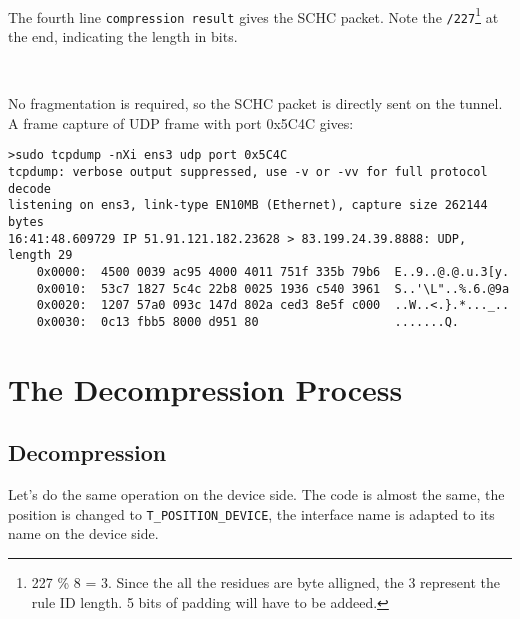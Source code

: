 ~~~

The fourth line \texttt{compression result} gives the SCHC packet. Note the \texttt{/227}\footnote {227 \% 8 = 3.  Since the all the residues are byte alligned, the 3 represent the rule ID length. 5 bits of padding will have to be addeed.} at the end, indicating the length in bits. 



~~

No fragmentation is required, so the SCHC packet is directly sent on the tunnel. A frame capture of UDP frame with port 0x5C4C gives:

\begin{lstlisting}[basicstyle=\ttfamily\scriptsize]
>sudo tcpdump -nXi ens3 udp port 0x5C4C
tcpdump: verbose output suppressed, use -v or -vv for full protocol decode
listening on ens3, link-type EN10MB (Ethernet), capture size 262144 bytes
16:41:48.609729 IP 51.91.121.182.23628 > 83.199.24.39.8888: UDP, length 29
	0x0000:  4500 0039 ac95 4000 4011 751f 335b 79b6  E..9..@.@.u.3[y.
	0x0010:  53c7 1827 5c4c 22b8 0025 1936 c540 3961  S..'\L"..%.6.@9a
	0x0020:  1207 57a0 093c 147d 802a ced3 8e5f c000  ..W..<.}.*..._..
	0x0030:  0c13 fbb5 8000 d951 80                   .......Q.

\end{lstlisting}

\section{The Decompression Process}

\subsection{Decompression}

Let's do the same operation on the device side. The code is almost the same, the position is changed to \texttt{T\_POSITION\_DEVICE}, the interface name is adapted to its name on the device side.

